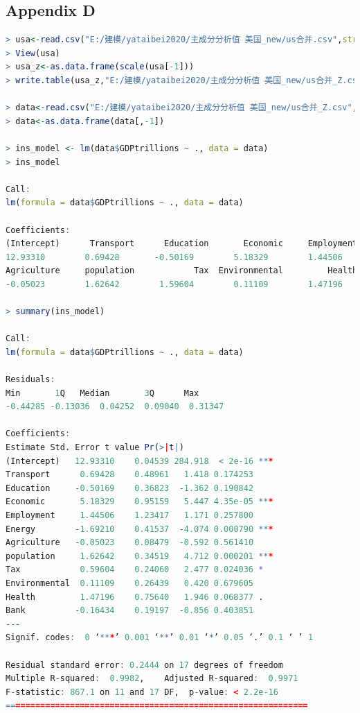 \documentclass{apmcmthesis}
\begin{document}
\subsection{Appendix D}
\begin{lstlisting}[language=r]
> usa<-read.csv("E:/建模/yataibei2020/主成分分析值 美国_new/us合并.csv",stringsAsFactors = FALSE)
> View(usa)
> usa_z<-as.data.frame(scale(usa[-1]))
> write.table(usa_z,"E:/建模/yataibei2020/主成分分析值 美国_new/us合并_Z.csv",row.names=FALSE, col.names=TRUE, sep="," )

> data<-read.csv("E:/建模/yataibei2020/主成分分析值 美国_new/us合并_Z.csv",stringsAsFactors = FALSE)
> data<-as.data.frame(data[,-1])

> ins_model <- lm(data$GDPtrillions ~ ., data = data)
> ins_model

Call:
lm(formula = data$GDPtrillions ~ ., data = data)

Coefficients:
(Intercept)      Transport      Education       Economic     Employment         Energy  
12.93310        0.69428       -0.50169        5.18329        1.44506       -1.69210  
Agriculture     population            Tax  Environmental         Health           Bank  
-0.05023        1.62642        1.59604        0.11109        1.47196       -0.16434 

> summary(ins_model)

Call:
lm(formula = data$GDPtrillions ~ ., data = data)

Residuals:
Min       1Q   Median       3Q      Max 
-0.44285 -0.13036  0.04252  0.09040  0.31347 

Coefficients:
Estimate Std. Error t value Pr(>|t|)    
(Intercept)   12.93310    0.04539 284.918  < 2e-16 ***
Transport      0.69428    0.48961   1.418 0.174253    
Education     -0.50169    0.36823  -1.362 0.190842    
Economic       5.18329    0.95159   5.447 4.35e-05 ***
Employment     1.44506    1.23417   1.171 0.257800    
Energy        -1.69210    0.41537  -4.074 0.000790 ***
Agriculture   -0.05023    0.08479  -0.592 0.561410    
population     1.62642    0.34519   4.712 0.000201 ***
Tax            0.59604    0.24060   2.477 0.024036 *  
Environmental  0.11109    0.26439   0.420 0.679605    
Health         1.47196    0.75640   1.946 0.068377 .  
Bank          -0.16434    0.19197  -0.856 0.403851    
---
Signif. codes:  0 ‘***’ 0.001 ‘**’ 0.01 ‘*’ 0.05 ‘.’ 0.1 ‘ ’ 1

Residual standard error: 0.2444 on 17 degrees of freedom
Multiple R-squared:  0.9982,	Adjusted R-squared:  0.9971 
F-statistic: 867.1 on 11 and 17 DF,  p-value: < 2.2e-16
=============================================================


\end{lstlisting}
\end{document}
